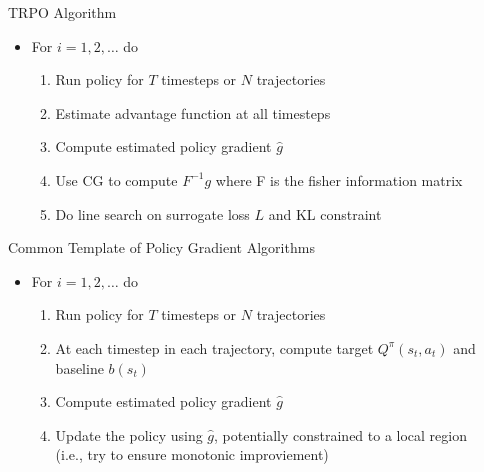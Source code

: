 \documentclass[aspectratio=169]{../latex_main/tntbeamer}  %
\begin{document}
\begin{frame}[c]{TRPO Algorithm~}

	\begin{itemize}
	    \item For $i= 1,2,\ldots$ do
	    \begin{enumerate}
	        \item Run policy for $T$ timesteps or $N$ trajectories
	        \item Estimate advantage function at all timesteps
	        \item Compute estimated policy gradient $\hat{g}$
	        \item Use CG to compute $F^{-1}g$ where F is the fisher information matrix
	        \item Do line search on surrogate loss $L$ and KL constraint
	    \end{enumerate}
	\end{itemize}



\end{frame}
\begin{frame}[c]{Common Template of Policy Gradient Algorithms}

	\begin{itemize}
	    \item For $i= 1,2,\ldots$ do
	    \begin{enumerate}
	        \item Run policy for $T$ timesteps or $N$ trajectories
	        \item At each timestep in each trajectory, compute target $Q^\pi(s_t, a_t)$ and baseline $b(s_t)$
	        \item Compute estimated policy gradient $\hat{g}$
	        \item Update the policy using $\hat{g}$, potentially constrained to a local region\\ (i.e., try to ensure monotonic improviement)
	    \end{enumerate}
	\end{itemize}



\end{frame}
\end{document}
